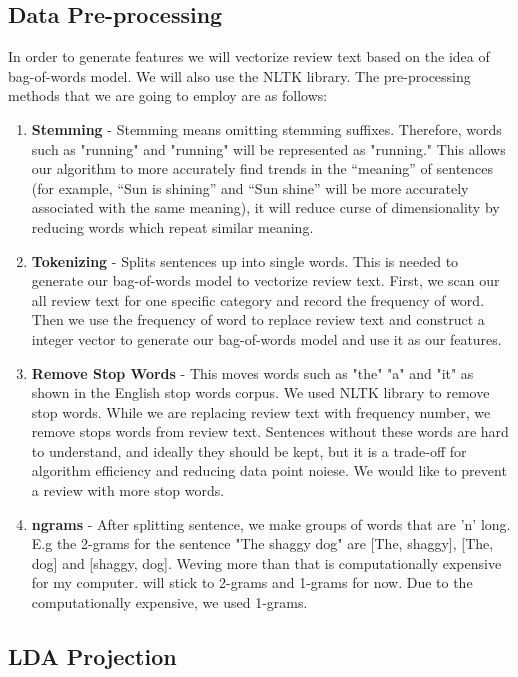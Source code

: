 \subsection{Data Pre-processing}
In order to generate features we will vectorize review text based on the idea of bag-of-words model. We will also use the NLTK library. The pre-processing methods that we are going to employ are as follows:

\begin{enumerate}
	\item \textbf{Stemming} - Stemming means omitting stemming suffixes. Therefore, words such as "running" and "running" will be represented as "running." This allows our algorithm to more accurately find trends in the “meaning” of sentences (for example, “Sun is shining” and “Sun shine” will be more accurately associated with the same meaning), it will reduce curse of dimensionality by reducing words which repeat similar meaning.
	\item \textbf{Tokenizing} - Splits sentences up into single words. This is needed to generate our bag-of-words model to vectorize review text. First, we scan our all review text for one specific category and record the frequency of word. Then we use the frequency of word to replace review text and construct a integer vector to generate our bag-of-words model and use it as our features.
	\item \textbf{Remove Stop Words} - This moves words such as "the" "a" and "it" as shown in the English stop words corpus. We used NLTK library to remove stop words. While we are replacing review text with frequency number, we remove stops words from review text. Sentences without these words are hard to understand, and ideally they should be kept, but it is a trade-off for algorithm efficiency and reducing data point noiese. We would like to prevent a review with more stop words.
	\item \textbf{ngrams} - After splitting sentence, we make groups of words that are 'n' long. E.g the 2-grams for the sentence "The shaggy dog" are [The, shaggy], [The, dog] and [shaggy, dog]. Weving more than that is computationally expensive for my computer. will stick to 2-grams and 1-grams for now. Due to the computationally expensive, we used 1-grams.\\
\end{enumerate}

\subsection{LDA Projection}

